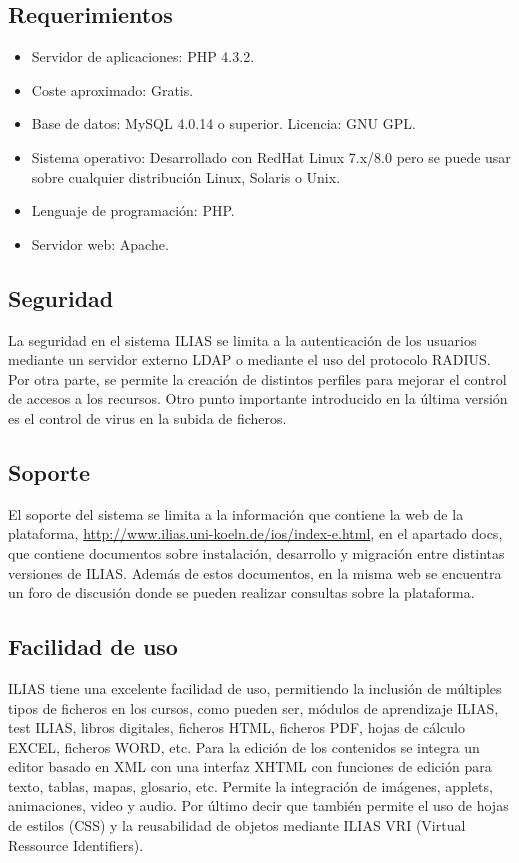 \subsection{Requerimientos}

\begin{itemize}
	\item Servidor de aplicaciones: PHP 4.3.2. 
	\item Coste aproximado: Gratis.
	\item Base de datos: MySQL 4.0.14 o superior. Licencia: GNU GPL.
	\item Sistema operativo: Desarrollado con RedHat Linux 7.x/8.0 pero se puede usar sobre cualquier distribución Linux, Solaris o Unix.
	\item Lenguaje de programación: PHP. 
	\item Servidor web: Apache.
\end{itemize}

\subsection{Seguridad}

La seguridad en el sistema ILIAS se limita a la autenticación de los usuarios mediante un servidor externo LDAP o mediante el uso del protocolo RADIUS. Por otra parte, se permite la creación de distintos perfiles para mejorar el control de accesos a los recursos. Otro punto importante introducido en la última versión es el control de virus en la subida de ficheros.

\subsection{Soporte}

El soporte del sistema se limita a la información que contiene la web de la plataforma, \url{http://www.ilias.uni-koeln.de/ios/index-e.html}, en el apartado docs, que contiene documentos sobre instalación, desarrollo y migración entre distintas versiones de ILIAS. Además de estos documentos, en la misma web se encuentra un foro de discusión donde se pueden realizar consultas sobre la plataforma.

\subsection{Facilidad de uso}

ILIAS tiene una excelente facilidad de uso, permitiendo la inclusión de múltiples tipos de ficheros en los cursos, como pueden ser, módulos de aprendizaje ILIAS, test ILIAS, libros digitales, ficheros HTML, ficheros PDF, hojas de cálculo EXCEL, ficheros WORD, etc. Para la edición de los contenidos se integra un editor basado en XML con una interfaz XHTML con funciones de edición para texto, tablas, mapas, glosario, etc. Permite la integración de imágenes, applets, animaciones, video y audio. Por último decir que también permite el uso de hojas de estilos (CSS) y la reusabilidad de objetos mediante ILIAS VRI (Virtual Ressource Identifiers).

